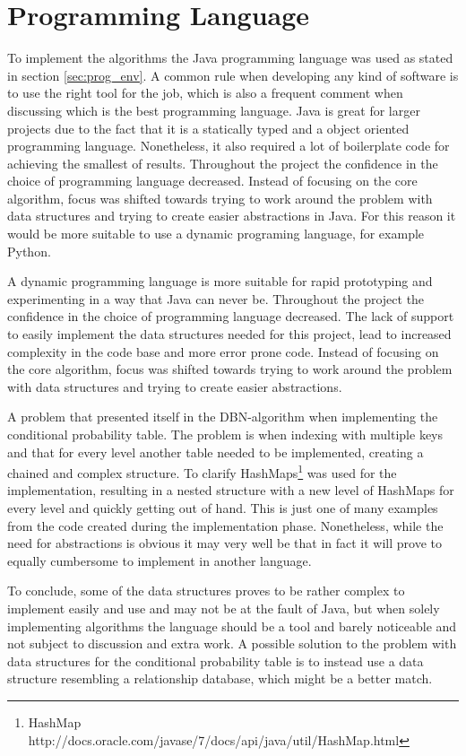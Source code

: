 \section{Programming Language}
\label{ap:prog_lang_eval}
To implement the algorithms the Java programming language was used as stated in section \ref{sec:prog_env}. A common rule when developing any kind of software is to use the right tool for the job, which is also a frequent comment when discussing which is the best programming language. Java is great for larger projects due to the fact that it is a statically typed and a object oriented programming language. Nonetheless, it also required a lot of boilerplate code for achieving the smallest of results. Throughout the project the confidence in the choice of programming language decreased. Instead of focusing on the core algorithm, focus was shifted towards trying to work around the problem with data structures and trying to create easier abstractions in Java. For this reason it would be more suitable to use a dynamic programing language, for example Python. 

A dynamic programming language is more suitable for rapid prototyping and experimenting in a way that Java can never be. Throughout the project the confidence in the choice of programming language decreased. The lack of support to easily implement the data structures needed for this project, lead to increased complexity in the code base and more error prone code. Instead of focusing on the core algorithm, focus was shifted towards trying to work around the problem with data structures and trying to create easier abstractions. 

A problem that presented itself in the DBN-\etre algorithm when implementing the conditional probability table. The problem is when indexing with multiple keys and that for every level another table needed to be implemented, creating a chained and complex structure. To clarify HashMaps\footnote{HashMap http://docs.oracle.com/javase/7/docs/api/java/util/HashMap.html} was used for the implementation, resulting in a nested structure with a new level of HashMaps for every level and quickly getting out of hand. This is just one of many examples from the code created during the implementation phase. Nonetheless, while the need for abstractions is obvious it may very well be that in fact it will prove to equally cumbersome to implement in another language.

To conclude, some of the data structures proves to be rather complex to implement easily and use and may not be at the fault of Java, but when solely implementing algorithms the language should be a tool and barely noticeable and not subject to discussion and extra work. A possible solution to the problem with data structures for the conditional probability table is to instead use a data structure resembling a relationship database, which might be a better match.

